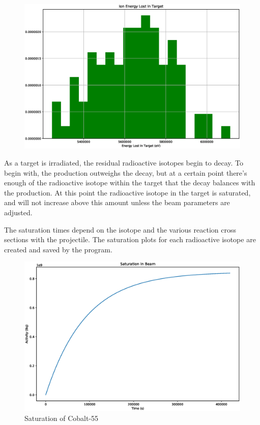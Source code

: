 \documentclass[12pt,twoside]{manual}
\begin{document}
\begin{figure}[h]
  \begin{center}
    \includegraphics[scale=0.4]{img/ion_energy_lost.eps}
  \end{center}
\end{figure}

As a target is irradiated, the residual radioactive isotopes begin to decay.  To begin with, the production outweighs the decay, but at a certain point there's enough of the radioactive isotope within the target that the decay balances with the production.  At this point the radioactive isotope in the target is saturated, and will not increase above this amount unless the beam parameters are adjusted.

The saturation times depend on the isotope and the various reaction cross sections with the projectile.  The saturation plots for each radioactive isotope are created and saved by the program.

\begin{figure}[h]
  \begin{center}
    \includegraphics[scale=0.25]{img/saturation_Co55.eps}
  \end{center}
  \caption{Saturation of Cobalt-55}
\end{figure}
\end{document}
